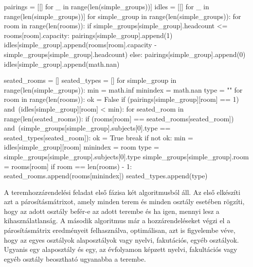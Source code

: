 \documentclass[12pt,a4paper]{report}
\begin{document}
\begin{python}
pairings = [[] for _ in range(len(simple_groups))]
idles = [[] for _ in range(len(simple_groups))]
for simple_group in range(len(simple_groups)):
    for room in range(len(rooms)):
        if simple_groups[simple_group].headcount <= rooms[room].capacity:
            pairings[simple_group].append(1)
            idles[simple_group].append(rooms[room].capacity -
            simple_groups[simple_group].headcount)
        else:
            pairings[simple_group].append(0)
            idles[simple_group].append(math.nan)

seated_rooms = []
seated_types = []
for simple_group in range(len(simple_groups)):
    min = math.inf
    minindex = math.nan
    type = ""
    for room in range(len(rooms)):
        ok = False
        if (pairings[simple_group][room] == 1) and\
           (idles[simple_group][room] < min):
            for seated_room in range(len(seated_rooms)):
                if (rooms[room] == seated_rooms[seated_room]) and\
                   (simple_groups[simple_group].subjects[0].type ==
                    seated_types[seated_room]):
                    ok = True
                    break
            if not ok:
                min = idles[simple_group][room]
                minindex = room
                type = simple_groups[simple_group].subjects[0].type
                simple_groups[simple_group].room = rooms[room]
        if room == len(rooms) - 1:
            seated_rooms.append(rooms[minindex])
            seated_types.append(type)
\end{python}

A teremhozzárendelési feladat első fázisa két algoritmusból áll. Az első elkészíti azt a párosításmátrixot, amely minden terem és minden osztály esetében rögzíti, hogy az adott osztály befér-e az adott terembe és ha igen, mennyi lesz a kihasználatlanság. A második algoritmus már a hozzárendeléseket végzi el a párosításmátrix eredményeit felhasználva, optimálisan, azt is figyelembe véve, hogy az egyes osztályok alaposztályok vagy nyelvi, fakutációs, egyéb osztályok. Ugyanis egy alaposztály és egy, az évfolyamon képzett nyelvi, fakultációs vagy egyéb osztály beosztható ugyanabba a terembe.
\end{document}
